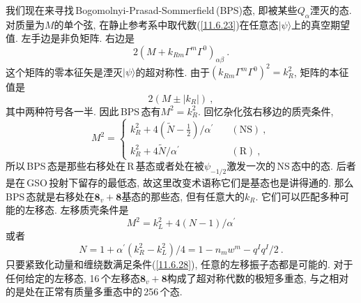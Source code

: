 我们现在来寻找\,Bogomolnyi-Prasad-Sommerfield\,(BPS)态, 即被某些$ Q_{\alpha} $湮灭的态. 对质量为$ M $的单个弦, 在静止参考系中取代数(\ref{11.6.23})在任意态$ \lvert \psi\rangle $上的真空期望值. 左手边是非负矩阵. 右边是
\begin{equation}
    2(M+k_{Rm}\Gamma^{m}\Gamma^{0})_{\alpha\beta} \:. \label{11.6.24}
\end{equation}
这个矩阵的零本征矢是湮灭$ \lvert\psi\rangle $的超对称性. 由于$ (k_{Rm}\Gamma^{m}\Gamma^{0})^{2}=k_{R}^{2}$, 矩阵的本征值是
\begin{equation}
    2(M\pm\lvert k_{R}\rvert) \:, \label{11.6.25}
\end{equation}
其中两种符号各一半. 因此\,BPS\,态有$ M^{2}=k_{R}^{2}$. 回忆杂化弦右移边的质壳条件,
\begin{equation}
    M^{2} = \begin{cases}
        k_{R}^{2}+4(\tilde{N}-\tfrac{1}{2})/\alpha^{\prime} & \quad(\text{NS})\:, \\
        k_{R}^{2}+4\tilde{N}/\alpha^{\prime} &\quad (\text{R})\:,
    \end{cases} \label{11.6.26}
\end{equation}
所以\,BPS\,态是那些右移处在\,R\,基态或者处在被$ \psi_{-1/2} $激发一次的\,NS\,态中的态. 后者是在\,GSO\,投射下留存的最低态, 故这里改变术语称它们是基态也是讲得通的. 那么\,BPS\,态就是右移处在$ \mathbf{8}_{v}+\mathbf{8} $基态的那些态, 但有任意大的$ k_{R}$. 它们可以匹配多种可能的左移态. 左移质壳条件是
\begin{equation}
    M^{2}=k_{L}^{2}+4(N-1)/\alpha^{\prime} \label{11.6.27}
\end{equation}
或者
\begin{equation}
    N=1+\alpha^{\prime}(k_{R}^{2}-k_{L}^{2})/4=1-n_{m}w^{m}-q^{I}q^{I}/2 \:. \label{11.6.28}
\end{equation}
只要紧致化动量和缠绕数满足条件(\ref{11.6.28}), 任意的左移振子态都是可能的. 对于任何给定的左移态, 16\,个左移态$ \mathbf{8}_{v}+\mathbf{8} $构成了超对称代数的极短多重态, 与之相对的是处在正常有质量多重态中的\,256\,个态.

